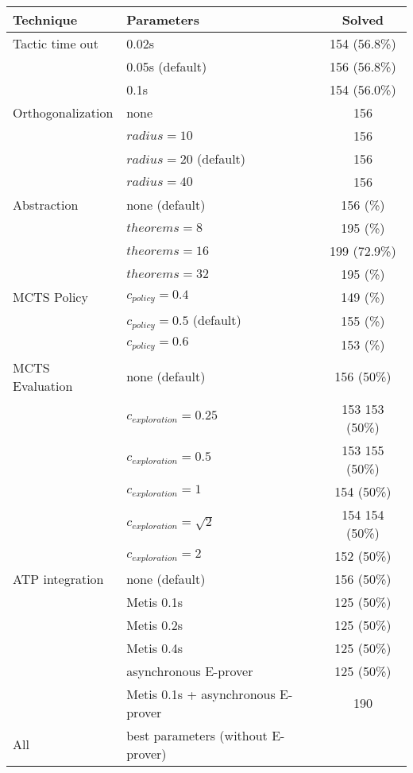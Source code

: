 \documentclass[runningheads,a4paper,draft]{svjour3}
\def\eprover{\textsf{E-prover}\xspace}
\def\metis{\textsf{Metis}\xspace}
\newcommand{\ra}[1]{\renewcommand{\arraystretch}{#1}}
\begin{document}
\begin{table}[ht]
\centering\ra{1.3}
\small
\begin{tabular}{llc}
\toprule
 Technique & Parameters & Solved \\
\midrule
Tactic time out & 0.02s & 154 (56.8\%)\\
                & 0.05s (default) & 156 (56.8\%)\\
                & 0.1s & 154 (56.0\%)\\
\midrule
Orthogonalization & none & 156 \\
                  & $radius = 10$ & 156 \\
                  & $radius = 20$ (default) & 156 \\ 
                  & $radius = 40$ & 156 \\
                  
\midrule
Abstraction       & none (default)  & 156 (\%)\\ 
                  & $theorems = 8$  & 195 (\%)\\
                  & $theorems = 16$ & 199 (72.9\%)\\
                  & $theorems = 32$ & 195 (\%)\\
\midrule
MCTS Policy & $c_{policy} = 0.4$ & 149 (\%)\\
            & $c_{policy} = 0.5$ (default) & 155 (\%)\\
            & $c_{policy} = 0.6$ & 153 (\%)\\
\midrule
MCTS Evaluation & none (default) & 156 (50\%) \\
				& $c_{exploration} = 0.25$ & 153 153 (50\%)\\ 
				& $c_{exploration} = 0.5$ & 153 155 (50\%)\\ 
				& $c_{exploration} = 1$ & 154 (50\%)\\
				& $c_{exploration} =\sqrt{2}$ & 154 154 (50\%)\\ 
				& $c_{exploration} = 2$ & 152 (50\%)\\ 
\midrule
ATP integration & none (default) & 156 (50\%)\\
                & \metis 0.1s & 125 (50\%)\\
                & \metis 0.2s & 125 (50\%)\\
                & \metis 0.4s & 125 (50\%)\\ 
                & asynchronous \eprover & 125 (50\%)\\
                & \metis 0.1s + asynchronous \eprover & 190\\
\midrule
All & best parameters (without \eprover) & \\ 
\bottomrule
\end{tabular}
\end{table}
\end{document}
